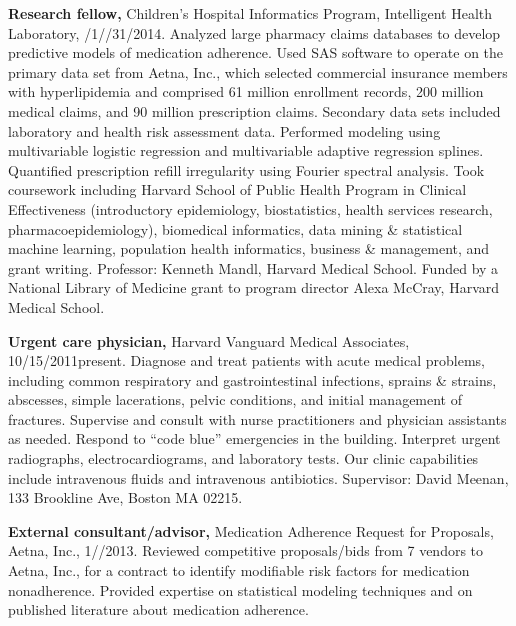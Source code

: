 \documentclass[12pt]{article}
\begin{document}
\textbf{Research fellow,} Children’s Hospital Informatics Program,
Intelligent Health Lab\-o\-ra\-to\-ry,
/1/\ndash{}/31/2014.
Analyzed large pharmacy claims databases to develop predictive models
of medication adherence. Used SAS software to operate on the primary
data set from Aetna, Inc., which selected commercial insurance members
with hyperlipidemia and comprised 61 million enrollment records, 200
million medical claims, and 90 million prescription claims. Secondary
data sets included laboratory and health risk assessment data.
Performed modeling using multivariable logistic regression and
multivariable adaptive regression splines. Quantified prescription
refill irregularity using Fourier spectral analysis. Took coursework
including Harvard School of Public Health Program in Clinical
Effectiveness (introductory epidemiology, biostatistics, health
services research, pharmacoepidemiology), biomedical informatics, data
mining \& statistical machine learning, population health informatics,
business \& management, and grant writing. Professor: Kenneth Mandl,
Harvard Medical School. Funded by a National Library of Medicine grant
to program director Alexa McCray, Harvard Medical School.

\textbf{Urgent care physician,} Harvard Vanguard Medical Associates,
10/15/2011\ndash{}present. Diagnose and treat patients with acute
medical problems, including common respiratory and gastrointestinal
infections, sprains \& strains, abscesses, simple lacerations, pelvic
conditions, and initial management of fractures. Supervise and consult
with nurse practitioners and physician assistants as needed. Respond
to “code blue” emergencies in the building. Interpret urgent
radiographs, electrocardiograms, and laboratory tests. Our clinic
capabilities include intravenous fluids and intravenous antibiotics.
Supervisor: David Meenan, 133 Brookline Ave, Boston MA 02215.

\textbf{External consultant/advisor,} Medication Adherence Request for
Proposals, Aetna, Inc.,
1/\ndash{}/2013. Reviewed competitive
proposals/bids from 7 vendors to Aetna, Inc., for a contract to
identify modifiable risk factors for medication nonadherence. Provided
expertise on statistical modeling techniques and on published
literature about medication adherence.
\end{document}
